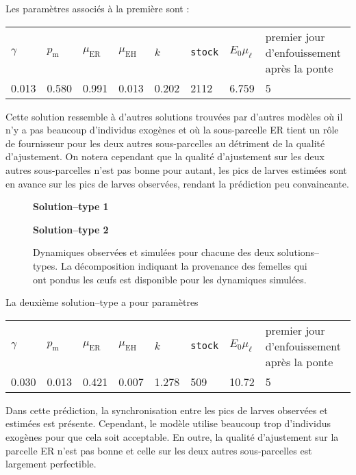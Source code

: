 Les paramètres associés à la première sont :
\begin{center}
\small
\begin{tabular}{llllllll}
$\gamma$ & $p_{\text{m}}$ & $\mu_{\text{ER}}$ & $\mu_{\text{EH}}$ & $k$ & \texttt{stock} & $E_0\mu_\ell$ & premier jour d'enfouissement après la ponte\\
0.013 & 0.580 & 0.991 & 0.013 & 0.202 & 2112 & 6.759 & 5
 \end{tabular}
\end{center}
Cette solution ressemble à d'autres solutions trouvées par d'autres modèles où il n'y a pas beaucoup d'individus exogènes et où la sous-parcelle ER tient un rôle de fournisseur pour les deux autres sous-parcelles au détriment de la qualité d'ajustement.
On notera cependant que la qualité d'ajustement sur les deux autres sous-parcelles n'est pas bonne pour autant, les pics de larves estimées sont en avance sur les pics de larves observées, rendant la prédiction peu convaincante.

\begin{figure}[ht]
 \centering
 \textbf{Solution--type 1}
 
 
 \textbf{Solution--type 2}
 
 \caption{Dynamiques observées et simulées pour chacune des deux solutions--types. La décomposition indiquant la provenance des femelles qui ont pondus les œufs est disponible pour les dynamiques simulées.}
 \label{fig:E1}
\end{figure}

La deuxième solution--type a pour paramètres
\begin{center}
\small
\begin{tabular}{llllllll}
$\gamma$ & $p_{\text{m}}$ & $\mu_{\text{ER}}$ & $\mu_{\text{EH}}$ & $k$ & \texttt{stock} & $E_0\mu_\ell$ & premier jour d'enfouissement après la ponte\\
0.030 & 0.013 & 0.421 & 0.007 & 1.278 & 509 & 10.72 & 5
 \end{tabular}
\end{center}
Dans cette prédiction, la synchronisation entre les pics de larves observées et estimées est présente.
Cependant, le modèle utilise beaucoup trop d'individus exogènes pour que cela soit acceptable.
En outre, la qualité d'ajustement sur la parcelle ER n'est pas bonne et celle sur les deux autres sous-parcelles est largement perfectible.

